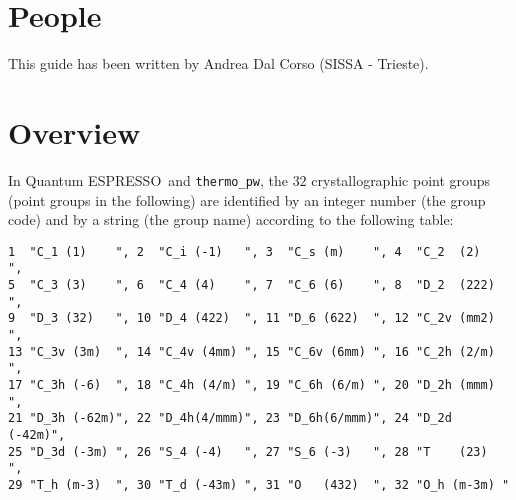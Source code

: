 \documentclass[12pt,a4paper,twoside]{report}
\def\qe{{\sc Quantum ESPRESSO}}
\def\tpw{\texttt{thermo\_pw}}
\begin{document}
\newpage
{\color{coral}\section{People}}
\color{black}
This guide has been written by Andrea Dal Corso (SISSA - Trieste).

\newpage
{\color{coral}\section{Overview}}
\color{black}
In \qe\ and \tpw, the $32$ crystallographic point groups 
(point groups in the following) are identified by an integer number 
(the group code) and 
by a string (the group name) according to the following table:

\begin{tcolorbox}
\begin{footnotesize}
\begin{verbatim}
1  "C_1 (1)    ", 2  "C_i (-1)   ", 3  "C_s (m)    ", 4  "C_2  (2)   ", 
5  "C_3 (3)    ", 6  "C_4 (4)    ", 7  "C_6 (6)    ", 8  "D_2  (222) ", 
9  "D_3 (32)   ", 10 "D_4 (422)  ", 11 "D_6 (622)  ", 12 "C_2v (mm2) ", 
13 "C_3v (3m)  ", 14 "C_4v (4mm) ", 15 "C_6v (6mm) ", 16 "C_2h (2/m) ", 
17 "C_3h (-6)  ", 18 "C_4h (4/m) ", 19 "C_6h (6/m) ", 20 "D_2h (mmm) ", 
21 "D_3h (-62m)", 22 "D_4h(4/mmm)", 23 "D_6h(6/mmm)", 24 "D_2d (-42m)", 
25 "D_3d (-3m) ", 26 "S_4 (-4)   ", 27 "S_6 (-3)   ", 28 "T    (23)  ", 
29 "T_h (m-3)  ", 30 "T_d (-43m) ", 31 "O   (432)  ", 32 "O_h (m-3m) "  
\end{verbatim}
\end{footnotesize}
\end{tcolorbox}
\end{document}
